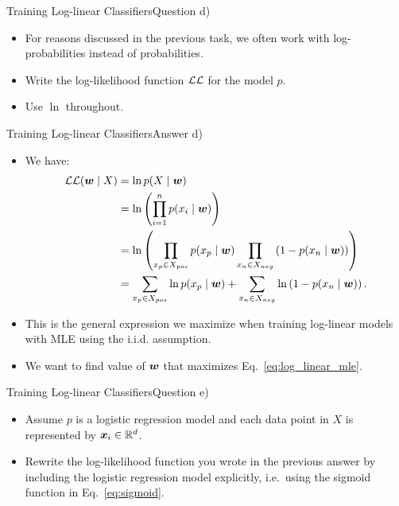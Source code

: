 \documentclass[t]{beamer}
\begin{document}
\begin{frame}{Training Log-linear Classifiers}{Question d)}
    \begin{itemize}
        \item For reasons discussed in the previous task, we often
              work with log-probabilities instead of probabilities.
        \item Write the log-likelihood function $\mathcal{LL}$ for the
              model $p$.
        \item Use $\ln$ throughout.
    \end{itemize}
\end{frame}

\begin{frame}{Training Log-linear Classifiers}{Answer d)}
    \begin{itemize}
        \item We have:
              \begin{align}
                  \mathcal{LL}({\boldsymbol{w}}\mid X) & = \ln p(X\mid{\boldsymbol{w}})                                                                                                            \\
                                      & = \ln \left(\prod_{i=1}^{n}p(x_i\mid{\boldsymbol{w}})\right)                                                                              \\
                                      & = \ln \left(\prod_{x_p\in X_{pos}}p(x_p\mid{\boldsymbol{w}})\prod_{x_n\in X_{neg}}\left(1 - p(x_n\mid{\boldsymbol{w}})\right)\right)                   \\
                                      & = \sum_{x_p\in X_{pos}}\ln p(x_p\mid{\boldsymbol{w}}) + \sum_{x_n\in X_{neg}}\ln\left(1 - p(x_n\mid{\boldsymbol{w}})\right). \label{eq:log_linear_mle}
              \end{align}
        \item This is the general expression we maximize when training
              log-linear models with MLE using the i.i.d. assumption.
        \item We want to find value of ${\boldsymbol{w}}$ that maximizes
              Eq.~\ref{eq:log_linear_mle}.
    \end{itemize}
\end{frame}

\begin{frame}{Training Log-linear Classifiers}{Question e)}
    \begin{itemize}
        \item Assume $p$ is a logistic regression model and each data
              point in $X$ is represented by ${\boldsymbol{x}}_i\in\mathbb{R}^d$.
        \item Rewrite the log-likelihood function you wrote in the
              previous answer by including the logistic regression
              model explicitly, i.e.\ using the sigmoid function in
              Eq.~\ref{eq:sigmoid}.
    \end{itemize}
\end{frame}
\end{document}
